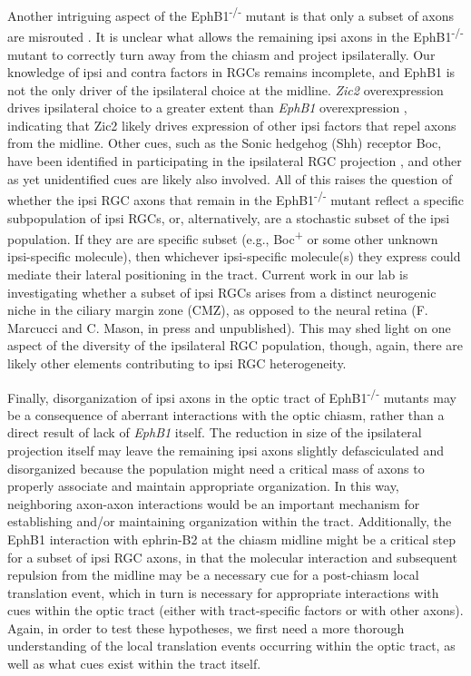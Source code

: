 Another intriguing aspect of the EphB1\textsuperscript{-/-} mutant is that only a subset of axons are misrouted \cite{williams2003ephrin,rebsam2009switching}.
It is unclear what allows the remaining ipsi axons in the EphB1\textsuperscript{-/-} mutant to correctly turn away from the chiasm and project ipsilaterally.
Our knowledge of ipsi and contra factors in RGCs remains incomplete, and EphB1 is not the only driver of the ipsilateral choice at the midline.
\emph{Zic2} overexpression drives ipsilateral choice to a greater extent than \emph{EphB1} overexpression \cite{garcia2008zic2}, indicating that Zic2 likely drives expression of other ipsi factors that repel axons from the midline.
Other cues, such as the Sonic hedgehog (Shh) receptor Boc, have been identified in participating in the ipsilateral RGC projection \cite{fabre2010segregation}, and other as yet unidentified cues are likely also involved.
All of this raises the question of whether the ipsi RGC axons that remain in the EphB1\textsuperscript{-/-} mutant reflect a specific subpopulation of ipsi RGCs, or, alternatively, are a stochastic subset of the ipsi population.
If they are are specific subset (e.g., Boc\textsuperscript{+} or some other unknown ipsi-specific molecule), then whichever ipsi-specific molecule(s) they express could mediate their lateral positioning in the tract.
Current work in our lab is investigating whether a subset of ipsi RGCs arises from a distinct neurogenic niche in the ciliary margin zone (CMZ), as opposed to the neural retina (F. Marcucci and C. Mason, in press and unpublished).
This may shed light on one aspect of the diversity of the ipsilateral RGC population, though, again, there are likely other elements contributing to ipsi RGC heterogeneity.

Finally, disorganization of ipsi axons in the optic tract of EphB1\textsuperscript{-/-} mutants may be a consequence of aberrant interactions with the optic chiasm, rather than a direct result of lack of \emph{EphB1} itself.
The reduction in size of the ipsilateral projection itself may leave the remaining ipsi axons slightly defasciculated and disorganized because the population might need a critical mass of axons to properly associate and maintain appropriate organization.
In this way, neighboring axon-axon interactions would be an important mechanism for establishing and/or maintaining organization within the tract.
Additionally, the EphB1 interaction with ephrin-B2 at the chiasm midline might be a critical step for a subset of ipsi RGC axons, in that the molecular interaction and subsequent repulsion from the midline may be a necessary cue for a post-chiasm local translation event, which in turn is necessary for appropriate interactions with cues within the optic tract (either with tract-specific factors or with other axons).
Again, in order to test these hypotheses, we first need a more thorough understanding of the local translation events occurring within the optic tract, as well as what cues exist within the tract itself.